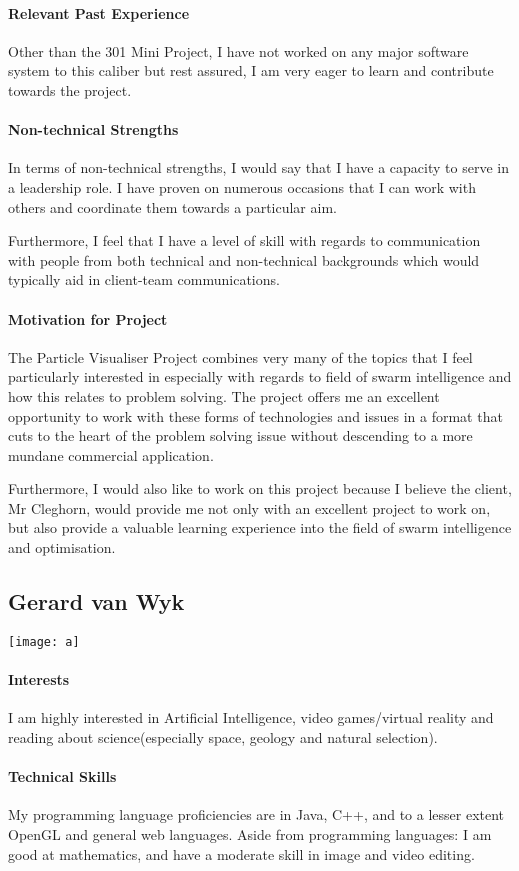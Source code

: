 \documentclass[12pt]{article}
\begin{document}
\paragraph{Relevant Past Experience}
Other than the 301 Mini Project, I have not worked on any major software system to this caliber but rest assured, I am very eager to learn and contribute towards the project.
\paragraph{Non-technical Strengths}
In terms of non-technical strengths, I would say that I have a capacity to serve in a leadership role. I have proven on numerous occasions that I can work with others and coordinate them towards a particular aim.

Furthermore, I feel that I have a level of skill with regards to communication with people from both technical and non-technical backgrounds which would typically aid in client-team communications.
\paragraph{Motivation for Project}
The Particle Visualiser Project combines very many of the topics that I feel particularly interested in especially with regards to field of swarm intelligence and how this relates to problem solving. The project offers me an excellent opportunity to work with these forms of technologies and issues in a format that cuts to the heart of the problem solving issue without descending to a more mundane commercial application.

Furthermore, I would also like to work on this project because I believe the client, Mr Cleghorn, would provide me not only with an excellent project to work on, but also provide a valuable learning experience into the field of swarm intelligence and optimisation.

\subsection{Gerard van Wyk}
\texttt{[image: a]}
\paragraph{Interests}
I am highly interested in Artificial Intelligence, video games/virtual reality and reading about science(especially space, geology and natural selection).
\paragraph{Technical Skills}
My programming language proficiencies are in Java, C++, and to a lesser extent OpenGL and general web languages.
Aside from programming languages: I am good at mathematics, and have a moderate skill in image and video editing.
\end{document}
